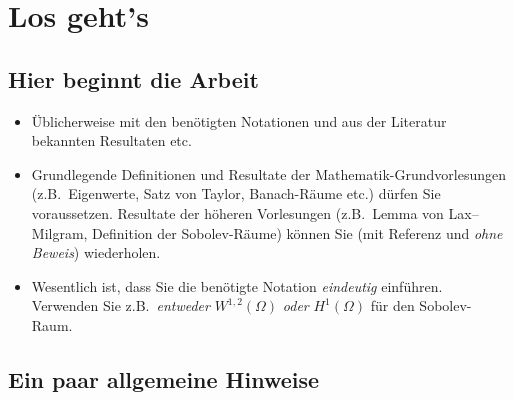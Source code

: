 \chapter{Los geht's}
\label{chapter:content}

\section{Hier beginnt die Arbeit}

\begin{itemize}
  \item Üblicherweise mit den benötigten Notationen und aus der Literatur bekannten Resultaten etc.
  \item Grundlegende Definitionen und Resultate der Mathematik-Grundvorlesungen (z.B.\ Eigenwerte, Satz von Taylor, Banach-Räume etc.) dürfen Sie voraussetzen. Resultate der höheren Vorlesungen (z.B.\ Lemma von Lax--Milgram, Definition der Sobolev-Räume) können Sie (mit Referenz und \emph{ohne Beweis}) wiederholen.
  \item Wesentlich ist, dass Sie die benötigte Notation \emph{eindeutig} einführen. Verwenden Sie z.B.\ \emph{entweder} $W^{1,2}(\Omega)$ \emph{oder} $H^1(\Omega)$ für den Sobolev-Raum.
\end{itemize}

\section{Ein paar allgemeine Hinweise}

